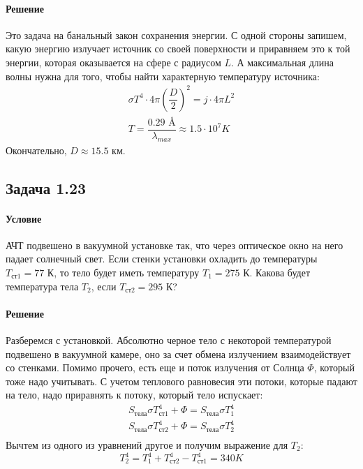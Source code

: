 \documentclass[12pt]{article}
\begin{document}
\paragraph{Решение}
Это задача на банальный закон сохранения энергии. С одной стороны запишем, какую энергию излучает источник со своей поверхности и приравняем это к той энергии, которая оказывается на сфере с радиусом $L$. А максимальная длина волны нужна для того, чтобы найти характерную температуру источника:
\begin{gather*}
    \sigma T^4 \cdot 4\pi\left( \dfrac{D}{2}\right)^2 = j\cdot4\pi L^2 \\
    T = \dfrac{0.29 \text{ \AA}}{\lambda_{max}} \approx 1.5 \cdot 10^7 K
\end{gather*}
Окончательно, $D\approx15.5$ км.

\subsection{Задача 1.23}
\label{task_123}
\paragraph{Условие}
АЧТ подвешено в вакуумной установке так, что через оптическое окно на него падает солнечный свет. Если стенки установки охладить до температуры $T_{\text{ст1}} = 77 $ К, то тело будет иметь температуру $T_{1} = 275 $ К. Какова будет температура тела $T_2$, если $T_{\text{ст2}} = 295 $ К?
\paragraph{Решение}
Разберемся с установкой. Абсолютно черное тело с некоторой температурой подвешено в вакуумной камере, оно за счет обмена излучением взаимодействует со стенками. Помимо прочего, есть еще и поток излучения от Солнца $\Phi$, который тоже надо учитывать. С учетом теплового равновесия эти потоки, которые падают на тело, надо приравнять к потоку, который тело испускает:
\begin{gather*}
    S_{\text{тела}}\sigma T^4_{\text{ст1}} + \Phi = S_{\text{тела}}\sigma T^4_1\\
    S_{\text{тела}}\sigma T^4_{\text{ст2}} + \Phi = S_{\text{тела}}\sigma T^4_2\\
\end{gather*}
Вычтем из одного из уравнений другое и получим выражение для $T_2$:
\begin{equation*}
    T_2^4 = T_1^4 + T^4_{\text{ст2}} - T^4_{\text{ст1}} = 340 K
\end{equation*}
\end{document}
